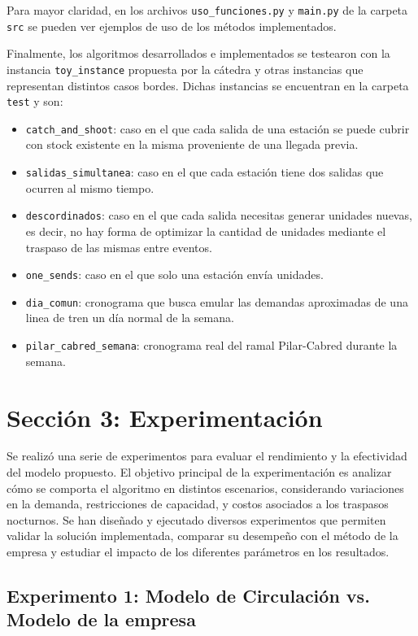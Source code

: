 \documentclass{article}
\begin{document}
Para mayor claridad, en los archivos \texttt{uso\_funciones.py} y \texttt{main.py} de la carpeta \texttt{src} se pueden ver ejemplos de uso de los métodos implementados.

Finalmente, los algoritmos desarrollados e implementados se testearon con la instancia \texttt{toy\_instance} propuesta por la cátedra y otras instancias que representan distintos casos bordes. Dichas instancias se encuentran en la carpeta \texttt{test} y son:

\begin{itemize}
	\item \texttt{catch\_and\_shoot}: caso en el que cada salida de una estación se puede cubrir con stock existente en la misma proveniente de una llegada previa.
	\item \texttt{salidas\_simultanea}: caso en el que cada estación tiene dos salidas que ocurren al mismo tiempo.
	\item \texttt{descordinados}: caso en el que cada salida necesitas generar unidades nuevas, es decir, no hay forma de optimizar la cantidad de unidades mediante el traspaso de las mismas entre eventos.
	\item \texttt{one\_sends}: caso en el que solo una estación envía unidades.
	\item \texttt{dia\_comun}: cronograma que busca emular las demandas aproximadas de una linea de tren un día normal de la semana.
	\item \texttt{pilar\_cabred\_semana}: cronograma real del ramal Pilar-Cabred durante la semana.

\end{itemize}

\section*{Sección 3: Experimentación}

Se realizó una serie de experimentos para evaluar el rendimiento y la efectividad del modelo propuesto. El objetivo principal de la experimentación es analizar cómo se comporta el algoritmo en distintos escenarios, considerando variaciones en la demanda, restricciones de capacidad, y costos asociados a los traspasos nocturnos. Se han diseñado y ejecutado diversos experimentos que permiten validar la solución implementada, comparar su desempeño con el método de la empresa y estudiar el impacto de los diferentes parámetros en los resultados.

\subsection*{Experimento 1: Modelo de Circulación vs. Modelo de la empresa}
\end{document}
